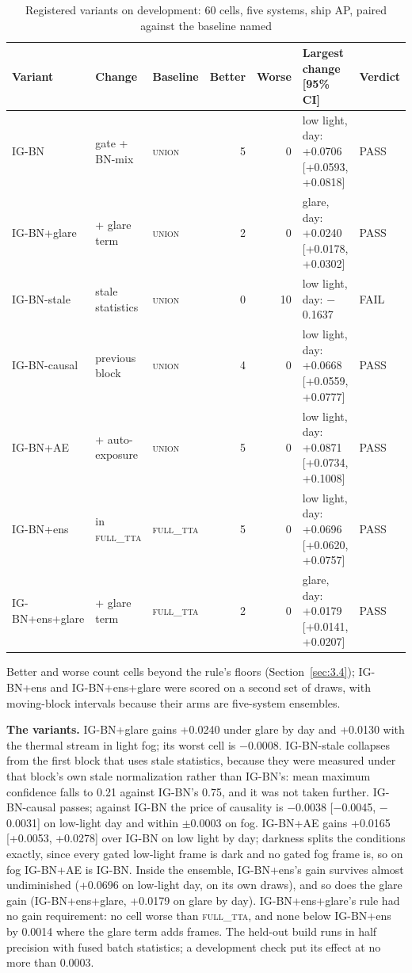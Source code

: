 \documentclass[journal]{IEEEtran}
\begin{document}
\begin{table}[!t]
\centering
\footnotesize
\caption{Registered variants on development: 60 cells, five systems, ship AP, paired against the baseline named}
\label{tab:2}
\setlength{\tabcolsep}{3pt}
\begin{tabularx}{\linewidth}{lllrr>{\raggedright\arraybackslash}Xl}
\toprule
Variant & Change & Baseline & Better & Worse & Largest change [95\% CI] & Verdict \\
\midrule
\mbox{IG-BN} & gate + BN-mix & \textsc{union} & 5 & 0 & low light, day: +0.0706 [+0.0593, +0.0818] & PASS \\
\mbox{IG-BN+glare} & + glare term & \textsc{union} & 2 & 0 & glare, day: +0.0240 [+0.0178, +0.0302] & PASS \\
\mbox{IG-BN-stale} & stale statistics & \textsc{union} & 0 & 10 & low light, day: $-$0.1637 & FAIL \\
\mbox{IG-BN-causal} & previous block & \textsc{union} & 4 & 0 & low light, day: +0.0668 [+0.0559, +0.0777] & PASS \\
\mbox{IG-BN+AE} & + auto-exposure & \textsc{union} & 5 & 0 & low light, day: +0.0871 [+0.0734, +0.1008] & PASS \\
\mbox{IG-BN+ens} & in \textsc{full\_tta} & \textsc{full\_tta} & 5 & 0 & low light, day: +0.0696 [+0.0620, +0.0757] & PASS \\
\mbox{IG-BN+ens+glare} & + glare term & \textsc{full\_tta} & 2 & 0 & glare, day: +0.0179 [+0.0141, +0.0207] & PASS \\
\bottomrule
\end{tabularx}
\par\smallskip\raggedright\footnotesize Better and worse count cells beyond the rule's floors (Section~\ref{sec:3.4}); \mbox{IG-BN+ens} and \mbox{IG-BN+ens+glare} were scored on a second set of draws, with moving-block intervals because their arms are five-system ensembles.
\end{table}
\textbf{The variants.} \mbox{IG-BN+glare} gains +0.0240 under glare by day and +0.0130 with the thermal stream in light fog; its worst cell is $-$0.0008. \mbox{IG-BN-stale} collapses from the first block that uses stale statistics, because they were measured under that block's own stale normalization rather than \mbox{IG-BN}'s: mean maximum confidence falls to 0.21 against \mbox{IG-BN}'s 0.75, and it was not taken further. \mbox{IG-BN-causal} passes; against \mbox{IG-BN} the price of causality is $-$0.0038 [$-$0.0045, $-$0.0031] on low-light day and within $\pm$0.0003 on fog. \mbox{IG-BN+AE} gains +0.0165 [+0.0053, +0.0278] over \mbox{IG-BN} on low light by day; darkness splits the conditions exactly, since every gated low-light frame is dark and no gated fog frame is, so on fog \mbox{IG-BN+AE} is \mbox{IG-BN}. Inside the ensemble, \mbox{IG-BN+ens}'s gain survives almost undiminished (+0.0696 on low-light day, on its own draws), and so does the glare gain (\mbox{IG-BN+ens+glare}, +0.0179 on glare by day). \mbox{IG-BN+ens+glare}'s rule had no gain requirement: no cell worse than \textsc{full\_tta}, and none below \mbox{IG-BN+ens} by 0.0014 where the glare term adds frames. The held-out build runs in half precision with fused batch statistics; a development check put its effect at no more than 0.0003.
\end{document}
